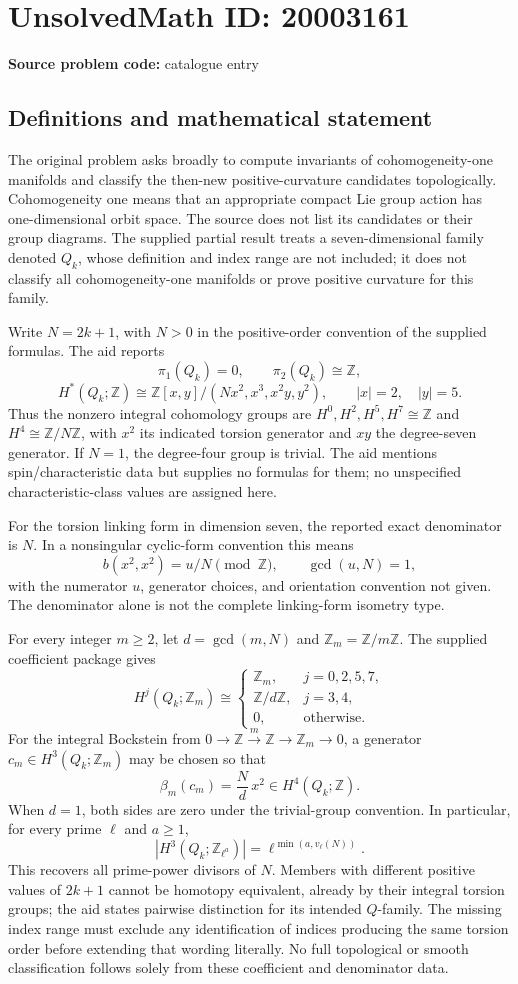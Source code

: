 \documentclass[11pt]{article}
\newcommand{\Z}{\mathbb{Z}}
\begin{document}
\section*{UnsolvedMath ID: 20003161}
\textbf{Source problem code:} catalogue entry
\subsection{Definitions and mathematical statement}
The original problem asks broadly to compute invariants of cohomogeneity-one manifolds and classify the then-new positive-curvature candidates topologically. Cohomogeneity one means that an appropriate compact Lie group action has one-dimensional orbit space. The source does not list its candidates or their group diagrams. The supplied partial result treats a seven-dimensional family denoted \(Q_k\), whose definition and index range are not included; it does not classify all cohomogeneity-one manifolds or prove positive curvature for this family.

Write \(N=2k+1\), with \(N>0\) in the positive-order convention of the supplied formulas. The aid reports
\[
 \pi_1(Q_k)=0,\qquad\pi_2(Q_k)\cong\Z,
\]
\[
 H^*(Q_k;\Z)\cong
 \Z[x,y]/(Nx^2,x^3,x^2y,y^2),\qquad |x|=2,\quad|y|=5.
\]
Thus the nonzero integral cohomology groups are \(H^0,H^2,H^5,H^7\cong\Z\) and \(H^4\cong\Z/N\Z\), with \(x^2\) its indicated torsion generator and \(xy\) the degree-seven generator. If \(N=1\), the degree-four group is trivial. The aid mentions spin/characteristic data but supplies no formulas for them; no unspecified characteristic-class values are assigned here.

For the torsion linking form in dimension seven, the reported exact denominator is \(N\). In a nonsingular cyclic-form convention this means
\[
 b(x^2,x^2)=u/N\pmod\Z,\qquad\gcd(u,N)=1,
\]
with the numerator \(u\), generator choices, and orientation convention not given. The denominator alone is not the complete linking-form isometry type.

For every integer \(m\geq2\), let \(d=\gcd(m,N)\) and \(\Z_m=\Z/m\Z\). The supplied coefficient package gives
\[
 H^j(Q_k;\Z_m)\cong
 \begin{cases}
 \Z_m,&j=0,2,5,7,\\
 \Z/d\Z,&j=3,4,\\
 0,&\text{otherwise}.
 \end{cases}
\]
For the integral Bockstein from \(0\to\Z\xrightarrow{\ m\ }\Z\to\Z_m\to0\), a generator \(c_m\in H^3(Q_k;\Z_m)\) may be chosen so that
\[
 \beta_m(c_m)=\frac Nd\,x^2\in H^4(Q_k;\Z).
\]
When \(d=1\), both sides are zero under the trivial-group convention. In particular, for every prime \(\ell\) and \(a\geq1\),
\[
 |H^3(Q_k;\Z_{\ell^a})|=\ell^{\min(a,v_\ell(N))}.
\]
This recovers all prime-power divisors of \(N\). Members with different positive values of \(2k+1\) cannot be homotopy equivalent, already by their integral torsion groups; the aid states pairwise distinction for its intended \(Q\)-family. The missing index range must exclude any identification of indices producing the same torsion order before extending that wording literally. No full topological or smooth classification follows solely from these coefficient and denominator data.
\end{document}
